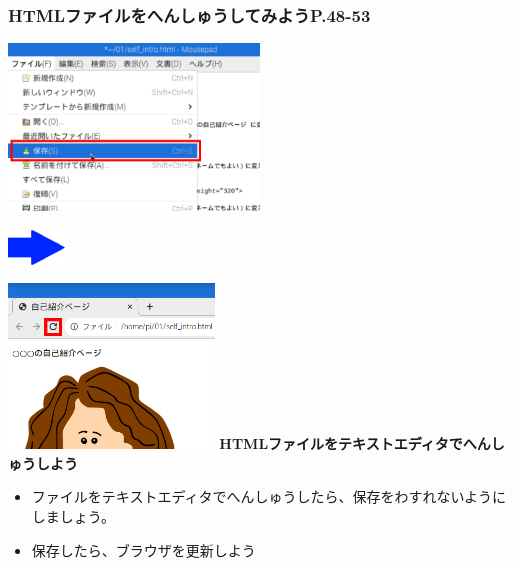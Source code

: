 \documentclass[dvipdfmx]{beamer}
\begin{document}
\begin{frame}[fragile]
	\frametitle{HTMLファイルをへんしゅうしてみようP.48-53~~~}
    \includegraphics[width=0.5\textwidth]{slide04_003.png}
    \begin{minipage}[b]{0.05\textwidth}
    \includegraphics[width=\textwidth]{slide04_005.png}
    \bigskip
    \end{minipage}
    \includegraphics[width=0.41\textwidth]{slide04_004.png}
    \vfill
    \large\textbf{HTMLファイルをテキストエディタでへんしゅうしよう}
        \begin{itemize}
          \item ファイルをテキストエディタでへんしゅうしたら、保存をわすれないようにしましょう。
          \item 保存したら、ブラウザを更新しよう
        \end{itemize}
\end{frame}
\end{document}
